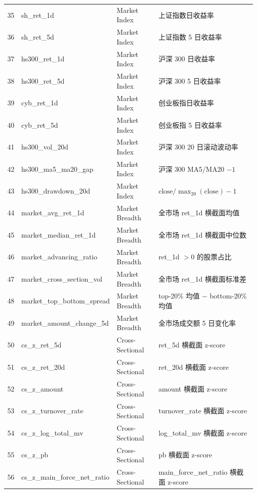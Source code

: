 {\begin{longtable}{@{}rllp{5.5cm}@{}}
\midrule
35 & sh\_ret\_1d             & Market Index & 上证指数日收益率 \\
36 & sh\_ret\_5d             & Market Index & 上证指数 5 日收益率 \\
37 & hs300\_ret\_1d          & Market Index & 沪深 300 日收益率 \\
38 & hs300\_ret\_5d          & Market Index & 沪深 300 5 日收益率 \\
39 & cyb\_ret\_1d            & Market Index & 创业板指日收益率 \\
40 & cyb\_ret\_5d            & Market Index & 创业板指 5 日收益率 \\
41 & hs300\_vol\_20d         & Market Index & 沪深 300 20 日滚动波动率 \\
42 & hs300\_ma5\_ma20\_gap    & Market Index & 沪深 300 MA5/MA20 $-1$ \\
43 & hs300\_drawdown\_20d    & Market Index & $\text{close} / \max_{20}(\text{close}) - 1$ \\
\midrule
44 & market\_avg\_ret\_1d     & Market Breadth & 全市场 ret\_1d 横截面均值 \\
45 & market\_median\_ret\_1d  & Market Breadth & 全市场 ret\_1d 横截面中位数 \\
46 & market\_advancing\_ratio & Market Breadth & ret\_1d $> 0$ 的股票占比 \\
47 & market\_cross\_section\_vol & Market Breadth & 全市场 ret\_1d 横截面标准差 \\
48 & market\_top\_bottom\_spread & Market Breadth & top-20\% 均值 $-$ bottom-20\% 均值 \\
49 & market\_amount\_change\_5d& Market Breadth & 全市场成交额 5 日变化率 \\
\midrule
50 & cs\_z\_ret\_5d           & Cross-Sectional & ret\_5d 横截面 z-score \\
51 & cs\_z\_ret\_20d          & Cross-Sectional & ret\_20d 横截面 z-score \\
52 & cs\_z\_amount            & Cross-Sectional & amount 横截面 z-score \\
53 & cs\_z\_turnover\_rate    & Cross-Sectional & turnover\_rate 横截面 z-score \\
54 & cs\_z\_log\_total\_mv    & Cross-Sectional & log\_total\_mv 横截面 z-score \\
55 & cs\_z\_pb               & Cross-Sectional & pb 横截面 z-score \\
56 & cs\_z\_main\_force\_net\_ratio & Cross-Sectional & main\_force\_net\_ratio 横截面 z-score \\

\end{longtable}}
